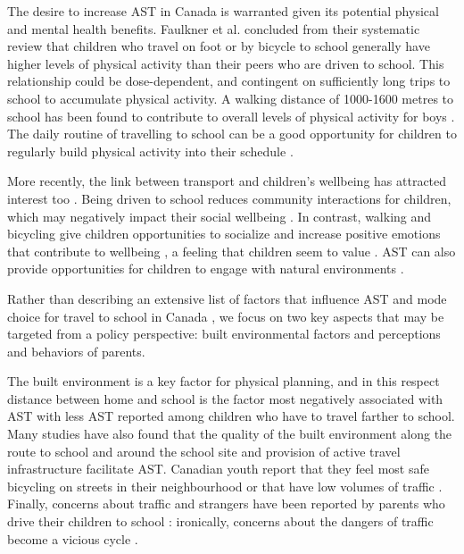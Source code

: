 \documentclass[preprint, 3p,
authoryear]{elsarticle} %
\begin{document}
The desire to increase AST in Canada is warranted given its potential
physical and mental health benefits. Faulkner et al.
\citeyearpar{faulknerActiveSchoolTransport2009} concluded from their
systematic review that children who travel on foot or by bicycle to
school generally have higher levels of physical activity than their
peers who are driven to school. This relationship could be
dose-dependent, and contingent on sufficiently long trips to school to
accumulate physical activity. A walking distance of 1000-1600 metres to
school has been found to contribute to overall levels of physical
activity for boys \citep{faulknerSchoolTravelChildren2013}. The daily
routine of travelling to school can be a good opportunity for children
to regularly build physical activity into their schedule
\citep{mitraIndependentMobilityMode2013}.

More recently, the link between transport and children's wellbeing has
attracted interest too \citep{waygoodTransportChildrenWellbeing2020}.
Being driven to school reduces community interactions for children,
which may negatively impact their social wellbeing
\citep{waygoodChildrenTravelIncidental2015}. In contrast, walking and
bicycling give children opportunities to socialize
\citep{michailChildrenExperiencesTheir2021} and increase positive
emotions that contribute to wellbeing
\citep{ramanathanHappinessMotionEmotions2014a}, a feeling that children
seem to value \citep{zwertsHowChildrenView2010}. AST can also provide
opportunities for children to engage with natural environments
\citep{fuscoUnderstandingChildrenPerceptions2012, romeroChildrenExperiencesEnjoyment2015}.

Rather than describing an extensive list of factors that influence AST
and mode choice for travel to school in Canada
\citep[e.g.,][]{mammenUnderstandingDriveEscort2012, mitraIndependentMobilityMode2013, rothmanDeclineActiveSchool2018, wilsonUnderstandingChildParent2018},
we focus on two key aspects that may be targeted from a policy
perspective: built environmental factors and perceptions and behaviors
of parents.

The built environment is a key factor for physical planning, and in this
respect distance between home and school is the factor most negatively
associated with AST
\citep{ikedaAssociationsChildrenActive2018, mammenUnderstandingDriveEscort2012, pontEnvironmentalCorrelatesChildren2009, rothmanDeclineActiveSchool2018}
with less AST reported among children who have to travel farther to
school. Many studies have also found that the quality of the built
environment along the route to school and around the school site
\citep{ikedaAssociationsChildrenActive2018, rothmanActiveSchoolTransportation2021}
and provision of active travel infrastructure
\citep{chenPromotingActiveStudent2018, pontEnvironmentalCorrelatesChildren2009}
facilitate AST. Canadian youth report that they feel most safe bicycling
on streets in their neighbourhood or that have low volumes of traffic
\citep{TACbikeinfra2020}. Finally, concerns about traffic and strangers
have been reported by parents who drive their children to school
\citep{mammenUnderstandingDriveEscort2012}: ironically, concerns about
the dangers of traffic become a vicious cycle
\citep{rothmanSchoolEnvironmentStudent2017}.
\end{document}
